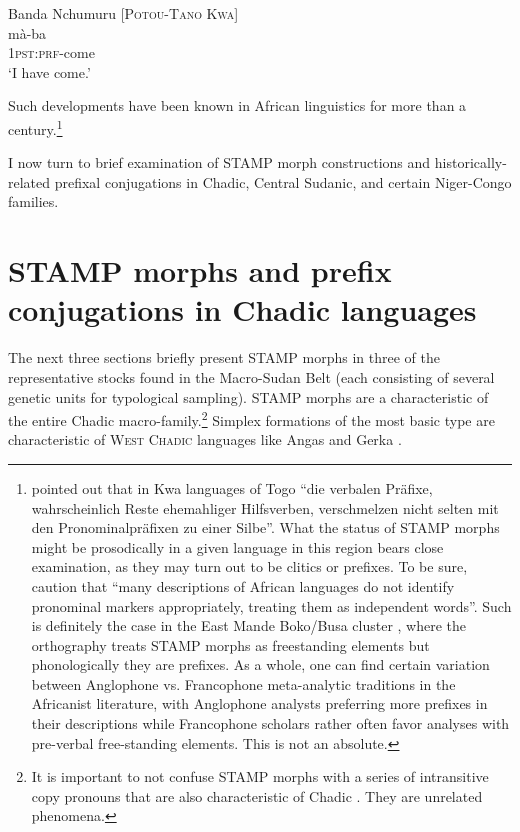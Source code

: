 \documentclass[output=paper]{langsci/langscibook}
\begin{document}
\ea\label{ex:anderson:40}
Banda Nchumuru \citep[Nuchumuru 4]{Cleal1973}      [\textsc{Potou-Tano} K\textsc{wa}]\\
\gll mà-ba\\
\textsc{1pst}:\textsc{prf}-come\\
\glt `I have come.'
\z

Such developments have been known in African linguistics for more than a century.\footnote{\citet[211]{Seidel1898} pointed out that in Kwa languages of Togo ``die verbalen Präfixe, wahrscheinlich Reste ehemahliger Hilfsverben, verschmelzen nicht selten mit den Pronominalpräfixen zu einer Silbe''. What the status of STAMP morphs might be prosodically in a given language in this region bears close examination, as they may turn out to be clitics or prefixes. To be sure, \citet[93]{CreisselsEtAl2008} caution that ``many descriptions of African languages do not identify pronominal markers appropriately, treating them as independent words''. Such is definitely the case in the East Mande Boko/Busa cluster \citep{Jones1998}, where the orthography treats STAMP morphs as freestanding elements but phonologically they are prefixes. As a whole, one can find certain variation between Anglophone vs. Francophone meta-analytic traditions in the Africanist literature, with Anglophone analysts preferring more prefixes in their descriptions while Francophone scholars rather often favor analyses with pre-verbal free-standing elements. This is not an absolute.} 

I now turn to brief examination of STAMP morph constructions and historically-related prefixal conjugations in Chadic, Central Sudanic, and certain Niger-Congo families.

\section{STAMP morphs and prefix conjugations in Chadic languages}\label{sec:Anderson:7}

The next three sections briefly present STAMP morphs in three of the representative stocks found in the Macro-Sudan Belt (each consisting of several genetic units for typological sampling). STAMP morphs are a characteristic of the entire Chadic macro-family.\footnote{It is important to not confuse STAMP morphs with a series of intransitive copy pronouns that are also characteristic of Chadic \citep{Frajzyngier1977, Burquest1986}. They are unrelated phenomena.} Simplex formations of the most basic type  are characteristic of \textsc{West Chadic} languages like Angas  and Gerka .
\end{document}
